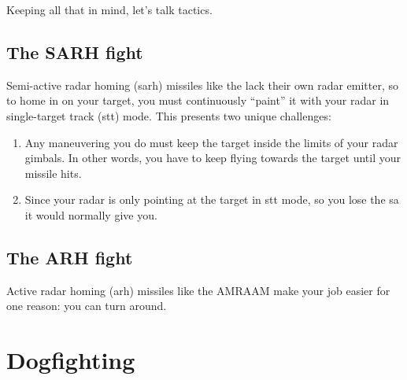 Keeping all that in mind, let's talk tactics.

\section{The SARH fight}

Semi-active radar homing \ac{(sarh)} missiles like the 
lack their own radar emitter, so to home in on your target,
you must continuously ``paint'' it with your radar in single-target track
\ac{(stt)} mode.
This presents two unique challenges:
\begin{enumerate}
\item Any maneuvering you do must keep the target inside the limits of your radar
    gimbals. In other words,
    you have to keep flying towards the target until your missile hits.
\item Since your radar is only pointing at the target in \ac{stt} mode,
    so you lose the \ac{sa} it would normally give you.
\end{enumerate}

\section{The ARH fight}

Active radar homing \ac{(arh)} missiles like the  AMRAAM
make your job easier for one reason: you can turn around.

\chapter{Dogfighting}
